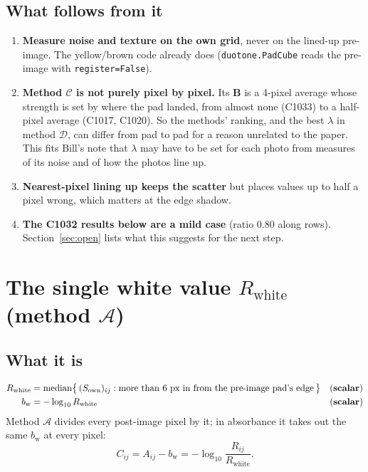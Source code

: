\documentclass[11pt,letterpaper]{article}
\newcommand{\code}[1]{\texttt{#1}}
\newcommand{\SCALAR}{\textbf{scalar}}
\newcommand{\mB}{\mathbf{B}}   %
\newcommand{\Rwhite}{R_{\text{white}}}
\newcommand{\bw}{b_{\text{w}}}
\newcommand{\MA}{\mathcal{A}}
\newcommand{\MC}{\mathcal{C}}
\newcommand{\MD}{\mathcal{D}}
\begin{document}
\subsection{What follows from it}

\begin{enumerate}
  \item \textbf{Measure noise and texture on the own grid}, never on the
    lined-up pre-image.  The yellow/brown code already does
    (\code{duotone.PadCube} reads the pre-image with \code{register=False}).
  \item \textbf{Method $\MC$ is not purely pixel by pixel.}  Its $\mB$ is a
    4-pixel average whose strength is set by where the pad landed, from
    almost none (C1033) to a half-pixel average (C1017, C1020).  So the
    methods' ranking, and the best $\lambda$ in method $\MD$, can differ from
    pad to pad for a reason unrelated to the paper.  This fits Bill's note
    that $\lambda$ may have to be set for each photo from measures of its
    noise and of how the photos line up.
  \item \textbf{Nearest-pixel lining up keeps the scatter} but places
    values up to half a pixel wrong, which matters at the edge shadow.
  \item \textbf{The C1032 results below are a mild case} (ratio 0.80 along
    rows).  Section~\ref{sec:open} lists what this suggests for the next
    step.
\end{enumerate}

\section{The single white value \texorpdfstring{$\Rwhite$}{R\_white}
(method \texorpdfstring{$\MA$}{A})}
\label{sec:white}

\subsection{What it is}

\begin{align}
  \Rwhite &= \operatorname{median}\bigl\{\,(S_\text{own})_{ij} :
    \text{more than 6 px in from the pre-image pad's edge} \,\bigr\}
    && \text{(\SCALAR)} \\
  \bw &= -\log_{10}\Rwhite && \text{(\SCALAR)}
\end{align}
Method $\MA$ divides every post-image pixel by it; in absorbance it takes
out the same $\bw$ at every pixel:
\begin{equation}
  C_{ij} = A_{ij} - \bw = -\log_{10}\frac{R_{ij}}{\Rwhite}.
\end{equation}
\end{document}
